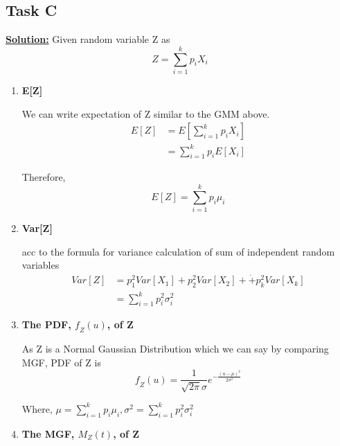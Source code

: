 \documentclass[12pt]{article}
\begin{document}
\subsection{Task C}
\textbf{\underline{Solution:}}
Given random variable Z as
\begin{equation}
    Z = \sum_{i=1}^kp_iX_i
\end{equation}
\begin{enumerate}
    \item \textbf{E[Z]}

We can write expectation of Z similar to the GMM above.
\begin{equation}
\begin{split}
    E[Z]& = E[\sum_{i=1}^kp_iX_i] \\
    & = \sum_{i=1}^kp_iE[X_i]
\end{split}
\end{equation}

Therefore,
\begin{equation}
    E[Z] = \sum_{i=1}^kp_i\mu_i
\end{equation}

    \item \textbf{Var[Z]}

acc to the formula for variance calculation of sum of independent random variables
\begin{equation}
\begin{split}
    Var[Z]& = p_1^2Var[X_1]+p_2^2Var[X_2]+\dot+p_k^2Var[X_k] \\
    & = \sum_{i=1}^k p_i^2\sigma^2_i
\end{split}
\end{equation}



    \item \textbf{The PDF, $\textit{f}_Z(u)$, of Z}

As Z is a Normal Gaussian Distribution which we can say by comparing MGF, PDF of Z is
\begin{equation}
    \textit{f}_Z(u) = \frac{1}{\sqrt{2\pi}\sigma}e^{-\frac{(u-\mu)^2}{2\sigma^2}}
\end{equation}
\begin{center}
    Where,  
          $\mu = \sum_{i=1}^kp_i\mu_i,   \sigma^2 = \sum_{i=1}^kp_i^2\sigma^2_i$
\end{center}

    \item \textbf{The MGF, $M_Z(t)$, of Z}


\end{enumerate}
\end{document}
